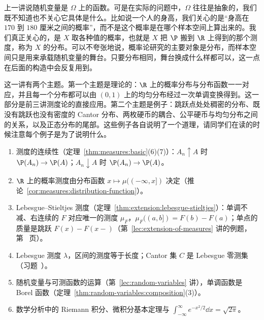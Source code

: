 \label{lec:distributions}

上一讲说随机变量是 $\Omega$ 上的函数。可是在实际的问题中，$\Omega$ 往往是抽象的，我们既不知道也不关心它具体是什么。比如说一个人的身高，我们关心的是“身高在 $170$ 到 $180$ 厘米之间的概率”，而不是这个概率是在哪个样本空间上算出来的。我们真正关心的，是 $X$ 取各种值的概率，也就是 $X$ 把 $\P$ 搬到 $\R$ 上得到的那个测度，称为 $X$ 的分布。可以不夸张地说，概率论研究的主要对象是分布，而样本空间只是用来承载随机变量的舞台。只要分布相同，舞台换成什么样都可以，这一点在后面的构造中会反复用到。

这一讲有两个主题。第一个主题是理论的：$\R$ 上的概率分布与分布函数一一对应，并且每一个分布都可以由 $(0,1)$ 上的均匀分布经过一次单调变换得到。这一部分是前三讲测度论的直接应用。第二个主题是例子：跳跃点处处稠密的分布、既没有跳跃也没有密度的 Cantor 分布、两枚硬币的耦合、公平硬币与均匀分布之间的关系，以及正态分布的尾部。这些例子各自说明了一个道理，请同学们在读的时候注意每个例子是为了说明什么。


\begin{enumerate}
\item 测度的连续性（定理~\ref{thm:measures:basic}(6)(7)）：$A_n\uparrow A$ 时 $\P(A_n)\to \P(A)$；$A_n\downarrow A$ 时 $\P(A_n)\to \P(A)$。
\item $\R$ 上的概率测度由分布函数 $x\mapsto\mu((-\infty,x])$ 决定（推论~\ref{cor:measures:distribution-function}）。
\item Lebesgue--Stieltjes 测度（定理~\ref{thm:extension:lebesgue-stieltjes}）：单调不减、右连续的 $F$ 对应唯一的测度 $\mu_F$，$\mu_F((a,b])=F(b)-F(a)$；单点的质量是跳跃 $F(x)-F(x-)$（第~\ref{lec:extension-of-measures} 讲的例题，第~\pageref{we:extension:atoms} 页）。
\item Lebesgue 测度 $\lambda$，区间的测度等于长度；Cantor 集 $C$ 是 Lebesgue 零测集（习题~）。
\item 随机变量与可测函数的运算（第~\ref{lec:random-variables} 讲），单调函数是 Borel 函数（定理~\ref{thm:random-variables:composition}(3)）。
\item 数学分析中的 Riemann 积分、微积分基本定理与 $\int_{-\infty}^\infty e^{-x^2/2}\dd x=\sqrt{2\pi}$。
\end{enumerate}

